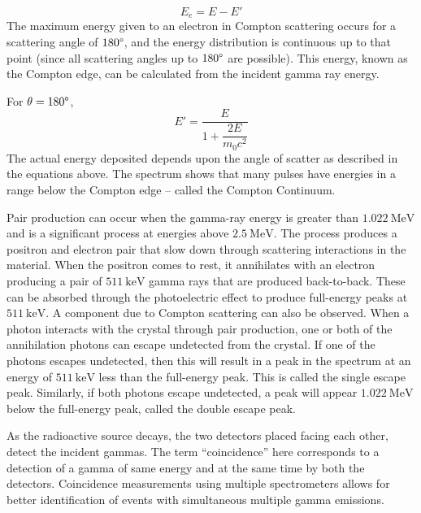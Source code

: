 \documentclass[%
 reprint,
nofootinbib,
 amsmath,amssymb,
 aps,
floatfix,
]{revtex4-2}
\begin{document}
    \begin{equation}
        E_e = E - E'
    \end{equation}
    The maximum energy given to an electron in Compton scattering occurs for a scattering angle of $180 \degree$, and the energy distribution is continuous up to that point (since all scattering angles up to $180 \degree$ are possible). This energy, known as the Compton edge, can be calculated from the incident gamma ray energy.
    \par
    For $\theta = 180 \degree$,
    \begin{equation}
        E' = \dfrac{E}{1 + \dfrac{2E}{m_0 c^2}}
    \end{equation}
    The actual energy deposited depends upon the angle of scatter as described in the equations above. The spectrum shows that many pulses have energies in a range below the Compton edge – called the Compton Continuum.
    \par
    Pair production can occur when the gamma-ray energy is greater than $\SI{1.022}{\mega \electronvolt}$ and is a significant process at energies above $\SI{2.5}{\mega \electronvolt}$. The process produces a positron and electron pair that slow down through scattering interactions in the material. When the positron comes to rest, it annihilates with an electron producing a pair of $\SI{511}{\kilo \electronvolt}$ gamma rays that are produced back-to-back. These can be absorbed through the photoelectric effect to produce full-energy peaks at $\SI{511}{\kilo \electronvolt}$. A component due to Compton scattering can also be observed. When a photon interacts with the crystal through pair production, one or both of the annihilation photons can escape undetected from the crystal. If one of the photons escapes undetected, then this will result in a peak in the spectrum at an energy of $\SI{511}{\kilo \electronvolt}$ less than the full-energy peak. This is called the single escape peak. Similarly, if both photons escape undetected, a peak will appear $\SI{1.022}{\mega \electronvolt}$ below the full-energy peak, called the double escape peak.
    \par
    As the radioactive source decays, the two detectors placed facing each other, detect the incident gammas. The term ``coincidence'' here corresponds to a detection of a gamma of same energy and at the same time by both the detectors. Coincidence measurements using multiple spectrometers allows for better identification of events with simultaneous multiple gamma emissions.
\end{document}
